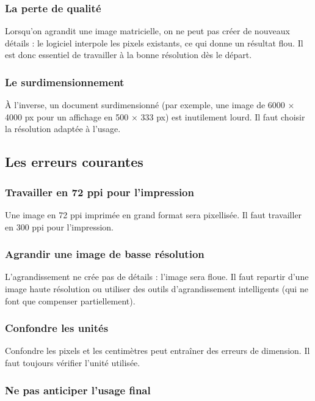 \subsubsection{La perte de qualité}

Lorsqu'on agrandit une image matricielle, on ne peut pas créer de nouveaux détails : le logiciel interpole les pixels existants, ce qui donne un résultat flou. Il est donc essentiel de travailler à la bonne résolution dès le départ.

\subsubsection{Le surdimensionnement}

À l'inverse, un document surdimensionné (par exemple, une image de 6000 × 4000 px pour un affichage en 500 × 333 px) est inutilement lourd. Il faut choisir la résolution adaptée à l'usage.

\subsection{Les erreurs courantes}

\subsubsection{Travailler en 72 ppi pour l'impression}

Une image en 72 ppi imprimée en grand format sera pixellisée. Il faut travailler en 300 ppi pour l'impression.

\subsubsection{Agrandir une image de basse résolution}

L'agrandissement ne crée pas de détails : l'image sera floue. Il faut repartir d'une image haute résolution ou utiliser des outils d'agrandissement intelligents (qui ne font que compenser partiellement).

\subsubsection{Confondre les unités}

Confondre les pixels et les centimètres peut entraîner des erreurs de dimension. Il faut toujours vérifier l'unité utilisée.

\subsubsection{Ne pas anticiper l'usage final}


